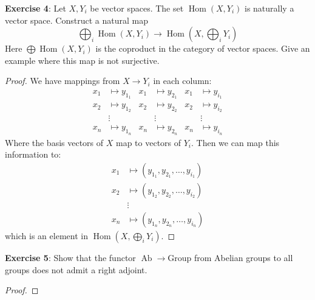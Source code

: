 \documentclass{article}
\begin{document}
\textbf{Exercise 4}: Let $X, Y_{i}$ be vector spaces. The set $\mathop{Hom}(X, Y_{i})$ is naturally a vector space. Construct a natural map
        \begin{equation*}
            \bigoplus_{i}\mathop{Hom}(X, Y_{i}) \rightarrow \mathop{Hom}(X, \bigoplus_{i}Y_{i})
        \end{equation*}
Here $\bigoplus \mathop{Hom}(X, Y_{i})$ is the coproduct in the category of vector spaces. Give an example where this map is not surjective.
    \begin{proof}
        We have mappings from $X \rightarrow Y_{i}$ in each column:
            \begin{align*}
                x_{1} &\mapsto  y_{1_{1}} & x_{1} &\mapsto  y_{2_{1}} & x_{1} &\mapsto  y_{i_{1}} \\
                x_{2} &\mapsto  y_{1_{2}} & x_{2} &\mapsto  y_{2_{2}} & x_{2} &\mapsto  y_{i_{2}} \\
                      &\vdots             &       &\vdots             &       &\vdots             \\
                x_{n} &\mapsto  y_{1_{n}} & x_{n} &\mapsto  y_{2_{n}} & x_{n} &\mapsto  y_{i_{n}}   
            \end{align*}
        Where the basis vectors of $X$ map to vectors of $Y_{i}$. Then we can map this information to:
            \begin{align*}
                x_{1} &\mapsto  (y_{1_{1}}, y_{2_{1}}, \ldots , y_{i_{1}}) \\
                x_{2} &\mapsto  (y_{1_{2}}, y_{2_{2}}, \ldots , y_{i_{2}}) \\
                      &\vdots                                              \\
                x_{n} &\mapsto  (y_{1_{n}}, y_{2_{n}}, \ldots , y_{i_{n}})   
            \end{align*}
        which is an element in $\mathop{Hom}(X, \bigoplus_{i}Y_{i})$.
    \end{proof}

\textbf{Exercise 5}: Show that the functor $\mathop{Ab} \rightarrow \text{Group}$ from Abelian groups to all groups does not admit a right adjoint.
    \begin{proof}
        
    \end{proof}
\end{document}
